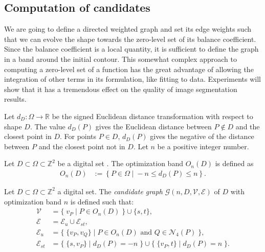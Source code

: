 \documentclass[review]{siamart220329}
\newcommand{\digset}{D} %
\begin{document}
\subsection{Computation of candidates}\label{sec:graph-cut-model}

We are going to define a directed weighted graph and set its edge weights such
that we can evolve the shape towards the zero-level set of its balance
coefficient. Since the balance coefficient is a local quantity, it is sufficient
to define the graph in a band around the initial contour. This somewhat complex
approach to computing a zero-level set of a function has the great advantage of
allowing the integration of other terms in its formulation, like fitting to
data. Experiments will show that it has a tremendous effect on the quality of
image segmentation results.

Let $d_{\digset}:\Omega \rightarrow \mathbb{R}$ be the signed Euclidean distance
transformation with respect to shape $\digset$. The value $d_{\digset}(P)$ gives the
Euclidean distance between $P \notin \digset$ and the closest point in $\digset$. For points
$P \in \digset$, $d_{\digset}(P)$ gives the negative of the distance between $P$ and the
closest point not in $\digset$. Let $n$ be a positive integer number.

\begin{definition}
Let $\digset \subset \Omega \subset \mathbb{Z}^2$ be a digital set . The optimization
band $O_n(\digset)$ is defined as
%
%
\begin{align*}
	O_n(\digset) &:=\left\{ P \in \Omega \; | \; -n \leq d_{\digset}(P) \leq n \right\}.
\end{align*}
\end{definition}
%
%
\begin{definition}
Let $\digset \subset \Omega \subset \mathbb{Z}^2$ a digital set. The {\em candidate
graph} $\mathcal{G}(n,\digset,\mathcal{V},\mathcal{E})$ of $\digset$ with optimization
band $n$ is defined such that:
%
%
\begin{align*}
\mathcal{V} &= \big\{\; v_P \; | \; P \in O_n(\digset) \;\} \cup \{s,t \big\}, \\
\mathcal{E} &= \mathcal{E}_u \cup \mathcal{E}_{st}, \\
\mathcal{E}_u &= \big\{ \; \{v_P,v_Q\} \; | \; P \in O_n(\digset) \text{ and } Q \in \mathcal{N}_4(P) \; \big\}, \\
\mathcal{E}_{st} &= \big\{\; \{s,v_P\} \; | \; d_\digset(P)=-n \; \big\} \cup \big\{\; \{v_P,t\} \; | \; d_\digset(P)=n \; \big\}.
\end{align*}
%
%
\end{definition}
\end{document}
